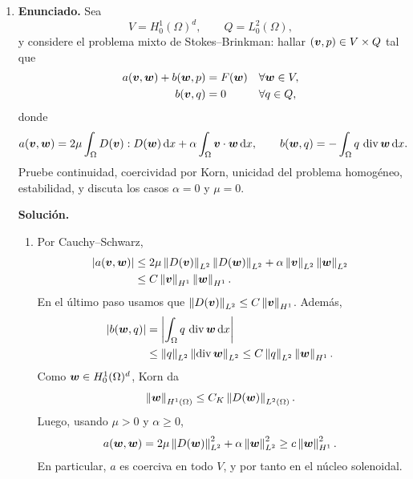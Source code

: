 \documentclass[11pt]{article}
\newcommand{\norm}[1]{\left\lVert #1\right\rVert}
\newcommand{\abs}[1]{\left|#1\right|}
\def\vec   #1{\mbox{\boldmath $#1$}{}}
\def\dx{\mbox{\(\,\mathrm{d}x\)}}
\DeclareMathOperator{\dive}{div}
\begin{document}
\begin{enumerate}[label=\textbf{\arabic*.}, leftmargin=*]

    \item \textbf{Enunciado.} Sea
    \[
        V=H^1_0(\Omega)^d,
        \qquad
        Q=L^2_0(\Omega),
    \]
    y considere el problema mixto de Stokes--Brinkman: hallar $(\vec v,p)\in V\times Q$ tal que
    \[
    \begin{aligned}
        a(\vec v,\vec w)+b(\vec w,p)&=F(\vec w) &&\forall\vec w\in V,\\
        b(\vec v,q)&=0 &&\forall q\in Q,
    \end{aligned}
    \]
    donde
    \[
        a(\vec v,\vec w)=2\mu\int_\Omega D(\vec v):D(\vec w)\dx
        +\alpha\int_\Omega \vec v\cdot\vec w\dx,
        \qquad
        b(\vec w,q)=-\int_\Omega q\,\dive\vec w\dx.
    \]
    Pruebe continuidad, coercividad por Korn, unicidad del problema homogéneo, estabilidad, y discuta los casos $\alpha=0$ y $\mu=0$.

    \textbf{Solución.}
    \begin{enumerate}[label=(\alph*)]
        \item Por Cauchy--Schwarz,
        \[
        \begin{aligned}
            \abs{a(\vec v,\vec w)}
            &\le
            2\mu\norm{D(\vec v)}_{L^2}\norm{D(\vec w)}_{L^2}
            +\alpha\norm{\vec v}_{L^2}\norm{\vec w}_{L^2}\\
            &\le
            C\norm{\vec v}_{H^1}\norm{\vec w}_{H^1}.
        \end{aligned}
        \]
        En el último paso usamos que $\norm{D(\vec v)}_{L^2}\le C\norm{\vec v}_{H^1}$.
        Además,
        \[
        \begin{aligned}
            \abs{b(\vec w,q)}
            &=
            \abs{\int_\Omega q\,\dive\vec w\dx}\\
            &\le
            \norm{q}_{L^2}\norm{\dive\vec w}_{L^2}
            \le C\norm{q}_{L^2}\norm{\vec w}_{H^1}.
        \end{aligned}
        \]
        Como $\vec w\in H^1_0(\Omega)^d$, Korn da
        \[
            \norm{\vec w}_{H^1(\Omega)}\le C_K\norm{D(\vec w)}_{L^2(\Omega)}.
        \]
        Luego, usando $\mu>0$ y $\alpha\ge0$,
        \[
            a(\vec w,\vec w)
            =
            2\mu\norm{D(\vec w)}_{L^2}^2+\alpha\norm{\vec w}_{L^2}^2
            \ge c\norm{\vec w}_{H^1}^2.
        \]
        En particular, $a$ es coerciva en todo $V$, y por tanto en el núcleo solenoidal.


\end{enumerate}
\end{enumerate}
\end{document}
